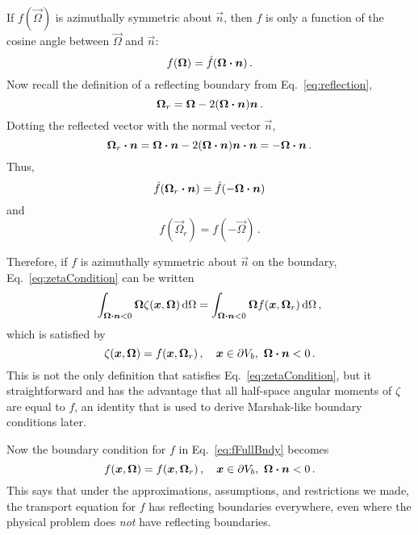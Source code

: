 If $f(\vec{\Omega})$ is azimuthally symmetric about $\vec{n}$, then $f$ is only
a function of the cosine angle between $\vec{\Omega}$ and $\vec{n}$:
\begin{equation*}
f(\bm{\Omega}) = \hat f( \bm{\Omega} \bm{\cdot} \bm{n})\,.
\end{equation*}
Now recall the definition of a reflecting boundary from
Eq.~\eqref{eq:reflection},
\begin{equation*}
  \bm{\Omega}_r = \bm{\Omega} - 2(\bm{\Omega} \bm{\cdot} \bm{n}) \bm{n}\,.
\end{equation*}
Dotting the reflected vector with the normal vector $\vec{n}$,
\begin{equation*}
  \bm{\Omega}_r \bm{\cdot} \bm{n}
  = \bm{\Omega} \bm{\cdot} \bm{n} - 2(\bm{\Omega} \bm{\cdot} \bm{n}) \bm{n}\bm{\cdot} \bm{n}
  = - \bm{\Omega} \bm{\cdot} \bm{n}\,.
\end{equation*}
Thus,
\begin{equation*}
  \hat f( \bm{\Omega}_r \bm{\cdot} \bm{n}) = \hat f( -\bm{\Omega} \bm{\cdot} \bm{n})
\end{equation*}
and
\begin{equation}\label{eq:aziSymResult}
  f( \vec{\Omega}_r) = f( -\vec{\Omega} )\,.
\end{equation}

Therefore, if $f$ is azimuthally symmetric about $\vec{n}$ on the
boundary, Eq.~\eqref{eq:zetaCondition} can be written
\begin{equation}\label{eq:zetaCondition2}
  \int_{\bm{\Omega} \bm{\cdot} \bm{n} < 0}
  \bm{\Omega} \zeta(\bm{x}, \bm{\Omega})\mathop{}\!\mathrm{d}\Omega
  = \int_{\bm{\Omega} \bm{\cdot} \bm{n} < 0}
  \bm{\Omega} f(\bm{x}, \bm{\Omega}_r)\mathop{}\!\mathrm{d}\Omega \,,
\end{equation}
which is satisfied by
\begin{equation} \label{eq:zeta}
  \zeta(\bm{x}, \bm{\Omega}) = f(\bm{x}, \bm{\Omega}_r) \,,
 \quad \bm{x} \in \partial V_b, \ \bm{\Omega} \bm{\cdot} \bm{n} < 0 \,.
\end{equation}
This is not the only definition that satisfies Eq.~\eqref{eq:zetaCondition},
but it straightforward and has the advantage that all half-space angular moments
of $\zeta$ are equal to $f$, an identity that is used to derive Marshak-like
boundary conditions later.

Now the boundary condition for $f$ in Eq.~\eqref{eq:fFullBndy} becomes
\begin{equation} \label{eq:fFullBndy2}
  f(\bm{x}, \bm{\Omega}) = f(\bm{x}, \bm{\Omega}_r) \,,
 \quad \bm{x} \in \partial V_b, \ \bm{\Omega} \bm{\cdot} \bm{n} < 0\,.
\end{equation}
This says that under the approximations, assumptions, and restrictions we made,
the transport equation for $f$ has reflecting boundaries everywhere, even
where the physical problem does \emph{not} have reflecting boundaries.

